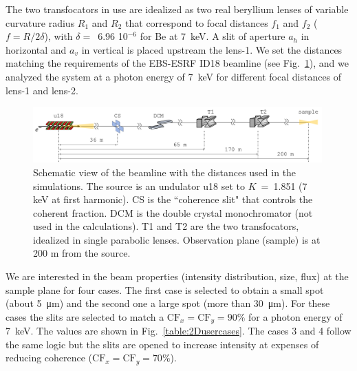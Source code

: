 \documentclass{iucr}              %
\begin{document}
The two transfocators in use are idealized as two real beryllium lenses of variable curvature radius $R_1$ and $R_2$ that correspond to focal distances $f_1$ and $f_2$ ($f=R/2\delta$), with $\delta=$~6.96 10$^{-6}$ for Be at \SI{7}{keV}. A slit of aperture $a_h$ in horizontal and $a_v$ in vertical is placed upstream the lens-1. We set the distances matching the requirements of the EBS-ESRF ID18 beamline (see Fig.~\ref{fig:beamline}), and we analyzed the system at a photon energy of \SI{7}{keV} for different focal distances of lens-1 and lens-2. 
\onecolumn
\begin{figure}\label{fig:beamline}
    \includegraphics[width=0.99\textwidth]{figures/beamline.pdf}
    \caption{Schematic view of the beamline with the distances used in the simulations. The source is an undulator u18 set to $K$~=~1.851 (7 keV at first harmonic). CS is the ``coherence slit" that controls the coherent fraction. DCM is the double crystal monochromator (not used in the calculations). T1 and T2 are the two transfocators, idealized in single parabolic lenses. Observation plane (sample) is at 200 m from the source. 
    }
\end{figure}
\twocolumn


We are interested in the beam properties (intensity distribution, size, flux) at the sample plane for four cases.
The first case is selected to obtain a small spot (about \SI{5}{\micro\meter}) and the second one a large spot (more than \SI{30}{\micro\meter}). For these cases the slits are selected to match a $\text{CF}_{x}=\text{CF}_{y}=90\%$ for a photon energy of \SI{7}{keV}. The values are shown in Fig.~\ref{table:2Dusercases}. The cases 3 and 4 follow the same logic but the slits are opened to increase intensity at expenses of reducing coherence  ($\text{CF}_{x}=\text{CF}_{y}=70\%$). 
\end{document}
